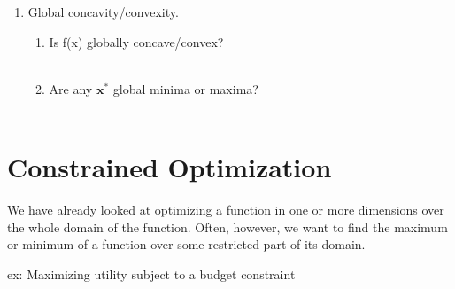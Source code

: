 \documentclass[]{book}
\theoremstyle{definition}
\theoremstyle{definition}
\theoremstyle{definition}
\theoremstyle{remark}
\begin{document}
\begin{enumerate}
  \item Global concavity/convexity.  
    \begin{enumerate}
    \item Is f(x) globally concave/convex?\\
        \\
    \item Are any $\mathbf{x^*}$ global minima or maxima?\\
        \\
    \end{enumerate}       
\end{enumerate}

\hypertarget{constrained-optimization}{%
\section{Constrained Optimization}\label{constrained-optimization}}

We have already looked at optimizing a function in one or more dimensions over the whole domain of the function. Often, however, we want to find the maximum or minimum of a function over some restricted part of its domain.

ex: Maximizing utility subject to a budget constraint
\end{document}
